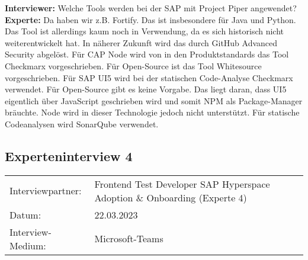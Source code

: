 \begin{linenumbers}
    \textbf{Interviewer:} Welche Tools werden bei der SAP mit Project Piper angewendet?\\
    \textbf{Experte:} Da haben wir z.B. Fortify. Das ist insbesondere für Java und Python. Das Tool ist allerdings kaum noch in Verwendung, da es sich historisch nicht weiterentwickelt hat. In näherer Zukunft wird das durch GitHub Advanced Security abgelöst. Für CAP Node wird von in den Produktstandards das Tool Checkmarx vorgeschrieben. Für Open-Source ist das Tool Whitesource vorgeschrieben. Für SAP UI5 wird bei der statischen Code-Analyse Checkmarx verwendet. Für Open-Source gibt es keine Vorgabe. Das liegt daran, dass UI5 eigentlich über JavaScript geschrieben wird und somit NPM als Package-Manager bräuchte. Node wird in dieser Technologie jedoch nicht unterstützt. Für statische Codeanalysen wird SonarQube verwendet.
\end{linenumbers}

\newpage
\resetlinenumber
\subsection{Experteninterview 4}
	\begin{tabular}{ l l }
		Interviewpartner: & Frontend Test Developer SAP Hyperspace Adoption \& Onboarding (Experte 4)\\
		Datum: & 22.03.2023\\
		Interview-Medium: & Microsoft-Teams\\
\end{tabular}\\\\

